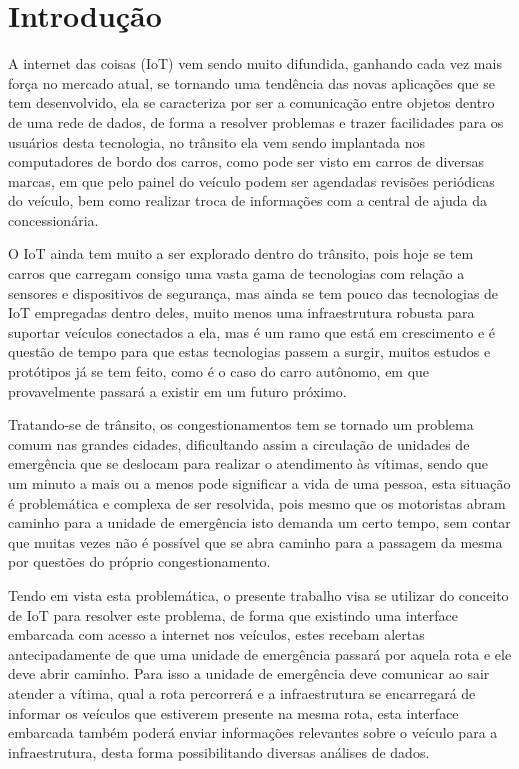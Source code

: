 \chapter{Introdução}
A internet das coisas (IoT) vem sendo muito difundida, ganhando cada vez mais força no mercado atual, se tornando uma tendência das novas aplicações que se tem desenvolvido, ela se caracteriza por ser a comunicação entre objetos dentro de uma rede de dados, de forma a resolver problemas e trazer facilidades para os usuários desta tecnologia, no trânsito ela vem sendo implantada nos computadores de bordo dos carros, como pode ser visto em carros de diversas marcas, em que pelo painel do veículo podem ser agendadas revisões periódicas do veículo, bem como realizar troca de informações com a central de ajuda da concessionária.~\cite{chevrolet}

O IoT ainda tem muito a ser explorado dentro do trânsito, pois hoje se tem carros que carregam consigo uma vasta gama de tecnologias com relação a sensores e dispositivos de segurança, mas ainda se tem pouco das tecnologias de IoT empregadas dentro deles, muito menos uma infraestrutura robusta para suportar veículos conectados a ela, mas é um ramo que está em crescimento e é questão de tempo para que estas tecnologias passem a surgir, muitos estudos e protótipos já se tem feito, como é o caso do carro autônomo, em que provavelmente passará a existir em um futuro próximo.

Tratando-se de trânsito, os congestionamentos tem se tornado um problema comum nas grandes cidades, dificultando assim a circulação de unidades de emergência que se deslocam para realizar o atendimento às vítimas, sendo que um minuto a mais ou a menos pode significar a vida de uma pessoa, esta situação é problemática e complexa de ser resolvida, pois mesmo que os motoristas abram caminho para a unidade de emergência isto demanda um certo tempo, sem contar que muitas vezes não é possível que se abra caminho para a passagem da mesma por questões do próprio congestionamento.

Tendo em vista esta problemática, o presente trabalho visa se utilizar do conceito de IoT para resolver este problema, de forma que existindo uma interface embarcada com acesso a internet nos veículos, estes recebam alertas antecipadamente de que uma unidade de emergência passará por aquela rota e ele deve abrir caminho. Para isso a unidade de emergência deve comunicar ao sair atender a vítima, qual a rota percorrerá e a infraestrutura se encarregará de informar os veículos que estiverem presente na mesma rota, esta interface embarcada também poderá enviar informações relevantes sobre o veículo para  a infraestrutura, desta forma possibilitando diversas análises de dados.

